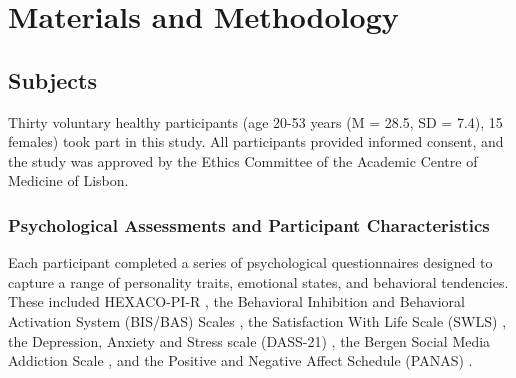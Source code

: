 
\chapter{Materials and Methodology}
\label{chapter:implementation}

\section{Subjects}
\label{section:verification}

Thirty voluntary healthy participants (age 20-53 years (M = 28.5, SD = 7.4), 15 females) took part in this study. All participants provided informed consent, and the study was approved by the Ethics Committee of the Academic Centre of Medicine of Lisbon.

\subsection{Psychological Assessments and Participant Characteristics}
\label{section:psychological}

Each participant completed a series of psychological questionnaires designed to capture a range of personality traits, emotional states, and behavioral tendencies. These included HEXACO-PI-R \cite{ashtonEmpiricalTheoreticalPractical2007,ashtonTheoreticalBasisMajor2001, leePsychometricPropertiesHEXACO1002018}, the Behavioral Inhibition and Behavioral Activation System (BIS/BAS) Scales \cite{carverBehavioralInhibitionBehavioral1994}, the Satisfaction With Life Scale (SWLS) \cite{dienerSatisfactionLifeScale1985a}, the Depression, Anxiety and Stress scale (DASS-21) \cite{lovibondStructureNegativeEmotional1995}, the Bergen Social Media Addiction Scale \cite{andreassenDevelopmentFacebookAddiction2012, banyaiProblematicSocialMedia2017}, and the Positive and Negative Affect Schedule (PANAS) \cite{watsonDevelopmentValidationBrief1988, crawfordPositiveNegativeAffect2004}.

